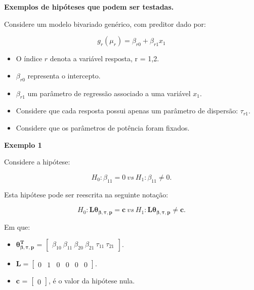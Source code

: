 \documentclass[10pt,
  aspectratio=169,
  serif,
  mathserif,
  professionalfont,
  compress,
  handout,
  ]{beamer}\usepackage[]{graphicx}\usepackage[]{color}
\begin{document}
\begin{frame}[c, allowframebreaks]

\textbf{Exemplos de hipóteses que podem ser testadas.}

Considere um modelo bivariado genérico, com preditor dado por:

$$g_r(\mu_r) = \beta_{r0} + \beta_{r1} x_1$$

\begin{itemize}
  
  \item O índice $r$ denota a variável resposta, r = 1,2.
  
  \item $\beta_{r0}$ representa o intercepto.
  
  \item $\beta_{r1}$ um parâmetro de regressão associado a uma variável $x_1$.
  
  \item Considere que cada resposta possui apenas um parâmetro de dispersão: $\tau_{r1}$.
  
  \item Considere que os parâmetros de potência foram fixados.
  
\end{itemize}

\end{frame}


\begin{frame}[c, allowframebreaks]

\textbf{Exemplo 1}

Considere a hipótese:

$$H_0: \beta_{11} = 0 \ vs \ H_1: \beta_{11} \neq 0.$$

Esta hipótese pode ser reescrita na seguinte notação:

$$H_0: \boldsymbol{L}\boldsymbol{\theta_{\beta,\tau,p}} = \boldsymbol{c} \ vs \ H_1: \boldsymbol{L}\boldsymbol{\theta_{\beta,\tau,p}} \neq \boldsymbol{c}.$$ 

Em que:

\begin{itemize}
  
  \item $\boldsymbol{\theta_{\beta,\tau,p}^T}$ = $\begin{bmatrix} \beta_{10} \  \beta_{11} \ \beta_{20} \ \beta_{21} \ \tau_{11} \ \tau_{21} \end{bmatrix}$.


\item $\boldsymbol{L} = \begin{bmatrix} 0 & 1 & 0 & 0 & 0 & 0  \end{bmatrix}.$
 
\item $\boldsymbol{c}$ = $\begin{bmatrix} 0 \end{bmatrix}$, é o valor da hipótese nula. 

\end{itemize}

\end{frame}
\end{document}
